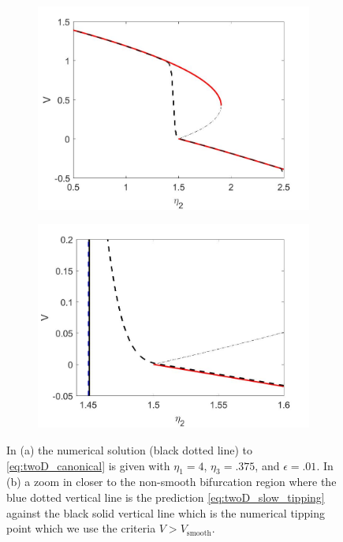 \begin{figure}[H]
\centering
\begin{subfigure}{.5\textwidth}
 \centering
 \includegraphics[width=\linewidth]{twoD/slow_bif_diagram.jpg}
 \caption{}
\end{subfigure}%
\begin{subfigure}{.5\textwidth}
 \centering
 \includegraphics[width=\linewidth]{twoD/slow_bif_diagram_zoom.jpg}
 \caption{}
\end{subfigure}
\caption{In (a) the numerical solution (black dotted line) to \eqref{eq:twoD_canonical} is given with $\eta_1=4$, $\eta_3=.375$, and $\epsilon=.01$. In (b) a zoom in closer to the non-smooth bifurcation region where the blue dotted vertical line is the prediction \eqref{eq:twoD_slow_tipping} against the black solid vertical line which is the numerical tipping point which we use the criteria $V>V_{\text{smooth}}$.}
\label{fig:twoD_slow_Vnumerics}
\end{figure}

